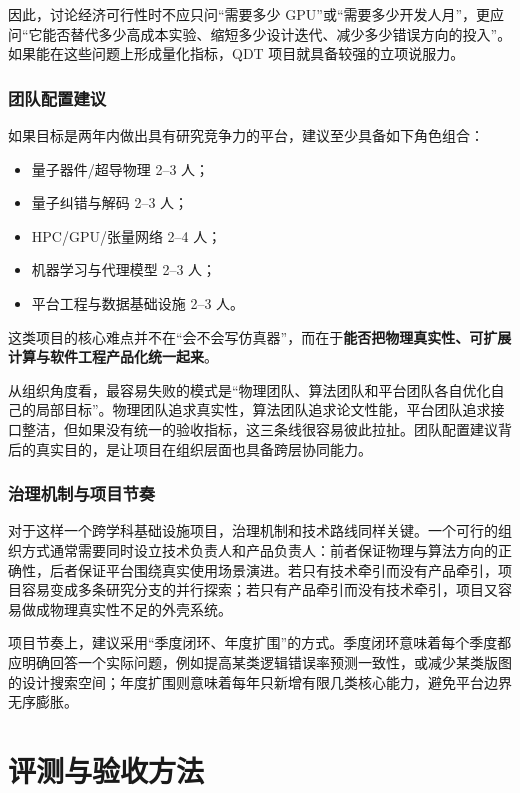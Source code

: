 \documentclass[11pt,a4paper]{article}
\newcommand{\QDT}{QDT}
\begin{document}
因此，讨论经济可行性时不应只问“需要多少 GPU”或“需要多少开发人月”，更应问“它能否替代多少高成本实验、缩短多少设计迭代、减少多少错误方向的投入”。如果能在这些问题上形成量化指标，\QDT{} 项目就具备较强的立项说服力。

\subsubsection{团队配置建议}

如果目标是两年内做出具有研究竞争力的平台，建议至少具备如下角色组合：

\begin{itemize}
  \item 量子器件/超导物理 2--3 人；
  \item 量子纠错与解码 2--3 人；
  \item HPC/GPU/张量网络 2--4 人；
  \item 机器学习与代理模型 2--3 人；
  \item 平台工程与数据基础设施 2--3 人。
\end{itemize}

这类项目的核心难点并不在“会不会写仿真器”，而在于\textbf{能否把物理真实性、可扩展计算与软件工程产品化统一起来}。

从组织角度看，最容易失败的模式是“物理团队、算法团队和平台团队各自优化自己的局部目标”。物理团队追求真实性，算法团队追求论文性能，平台团队追求接口整洁，但如果没有统一的验收指标，这三条线很容易彼此拉扯。团队配置建议背后的真实目的，是让项目在组织层面也具备跨层协同能力。

\subsubsection{治理机制与项目节奏}

对于这样一个跨学科基础设施项目，治理机制和技术路线同样关键。一个可行的组织方式通常需要同时设立技术负责人和产品负责人：前者保证物理与算法方向的正确性，后者保证平台围绕真实使用场景演进。若只有技术牵引而没有产品牵引，项目容易变成多条研究分支的并行探索；若只有产品牵引而没有技术牵引，项目又容易做成物理真实性不足的外壳系统。

项目节奏上，建议采用“季度闭环、年度扩围”的方式。季度闭环意味着每个季度都应明确回答一个实际问题，例如提高某类逻辑错误率预测一致性，或减少某类版图的设计搜索空间；年度扩围则意味着每年只新增有限几类核心能力，避免平台边界无序膨胀。

\section{评测与验收方法}
\end{document}
